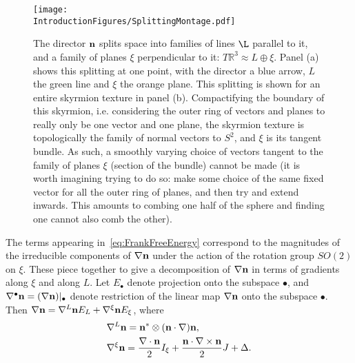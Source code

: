 \begin{figure}[htbp]
\centering
\texttt{[image: \\IntroductionFigures/SplittingMontage.pdf]}
\caption{ The director $\bf n $ splits space into families of lines $\L$ parallel to it, and a family of planes $\xi$ perpendicular to it: $T \mathbb{R}^3 \approx L \oplus \xi$. Panel (a) shows this splitting at one point, with the director a blue arrow, $L$ the green line and $\xi$ the orange plane. This splitting is shown for an entire skyrmion texture in panel (b). Compactifying the boundary of this skyrmion, i.e. considering the outer ring of vectors and planes to really only be one vector and one plane, the skyrmion texture is topologically the family of normal vectors to $S^2$, and $\xi$ is its tangent bundle. As such, a smoothly varying choice of vectors tangent to the family of planes $\xi$ (section of the bundle) cannot be made (it is worth imagining trying to do so: make some choice of the same fixed vector for all the outer ring of planes, and then try and extend inwards. This amounts to combing one half of the sphere and finding one cannot also comb the other).}
\label{fig:SplittingMontage}
\end{figure}
The terms appearing in~\eqref{eq:FrankFreeEnergy} correspond to the magnitudes of the irreducible components of $\nabla{\bf n}$ under the action of the rotation group $SO(2)$ on $\xi$. These piece together to give a decomposition of $\nabla {\bf n}$ in terms of gradients along $\xi$ and along $L$. Let $E_\bullet$ denote projection onto the subspace $\bullet$, and $\nabla^\bullet \bf n = (\nabla \bf n)|_\bullet$ denote restriction of the linear map $\nabla \bf n$ onto the subspace $\bullet$. Then $\nabla {\bf n}=\nabla^{L}{\bf n}E_L + \nabla^\xi {\bf n}E_\xi$, where 
\begin{align}
    &\nabla^L {\bf n}=  {\bf n}^* \otimes ({\bf n} \cdot \nabla) {\bf n}\label{eq:GradientDecompositionpar}, \\
    &\nabla^\xi {\bf n}= \frac{\nabla \cdot {\bf n}}{2}I_\xi + \frac{{\bf n} \cdot \nabla \times {\bf n}}{2} J + \Delta .
    \label{eq:GradientDecompositionperp}
\end{align}
